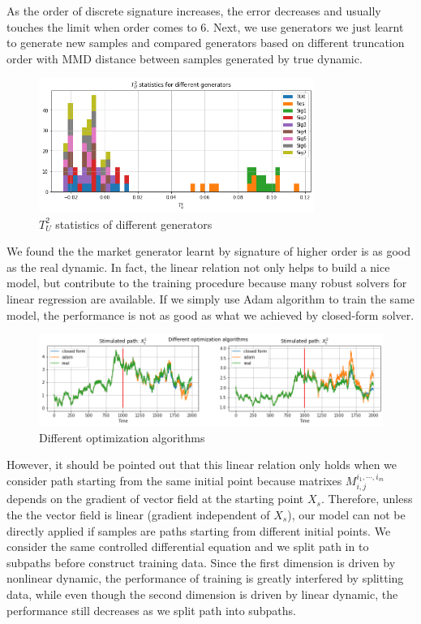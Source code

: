 \documentclass[12pt]{report}
\theoremstyle{definition}
\theoremstyle{remark}
\begin{document}
As the order of discrete signature increases, the error decreases and usually touches the limit when order comes to 6. 
Next, we use generators we just learnt to generate new samples and compared generators based on different truncation order with MMD distance between samples generated by true dynamic. 
\begin{figure}[H]
  \centering
  \includegraphics[width=0.8\textwidth]{figs/res5.png}
  \caption{$T_{U}^{2}$ statistics of different generators}
\end{figure}
We found the the market generator learnt by signature of higher order is as good as the real dynamic. In fact, the linear relation not only helps to build a nice model, but contribute to the training procedure because many robust solvers for linear regression are available. If we simply use Adam algorithm to train the same model, the performance is not as good as what we achieved by closed-form solver. 
\begin{figure}[H]
  \centering
  \includegraphics[width=\textwidth]{figs/res6.png}
  \caption{Different optimization algorithms}
\end{figure}
However, it should be pointed out that this linear relation only holds when we consider path starting from the same initial point because matrixes $M^{i_{1},\cdots,i_{m}}_{i,j}$ depends on the gradient of vector field at the starting point $X_{s}$. Therefore, unless the the vector field is linear (gradient independent of $X_{s}$), our model can not be directly applied if samples are paths starting from different initial points. We consider the same controlled differential equation and we split path in to subpaths before construct training data. Since the first dimension is driven by nonlinear dynamic, the performance of training is greatly interfered by splitting data, while even though the second dimension is driven by linear dynamic, the performance still decreases as we split path into subpaths. 
\end{document}
